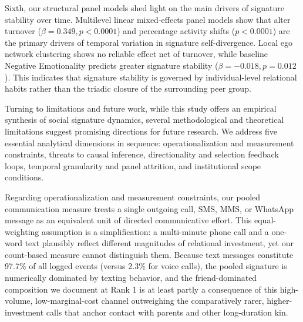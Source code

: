 \documentclass[11pt,letterpaper]{article}
\begin{document}
Sixth, our structural panel models shed light on the main drivers of signature stability over time. Multilevel linear mixed-effects panel models show that alter turnover ($\beta = 0.349, p < 0.0001$) and percentage activity shifts ($p < 0.0001$) are the primary drivers of temporal variation in signature self-divergence. Local ego network clustering shows no reliable effect net of turnover, while baseline Negative Emotionality predicts greater signature stability ($\beta = -0.018, p = 0.012$). This indicates that signature stability is governed by individual-level relational habits rather than the triadic closure of the surrounding peer group.

Turning to limitations and future work, while this study offers an empirical synthesis of social signature dynamics, several methodological and theoretical limitations suggest promising directions for future research. We address five essential analytical dimensions in sequence: operationalization and measurement constraints, threats to causal inference, directionality and selection feedback loops, temporal granularity and panel attrition, and institutional scope conditions.

Regarding operationalization and measurement constraints, our pooled communication measure treats a single outgoing call, SMS, MMS, or WhatsApp message as an equivalent unit of directed communicative effort. This equal-weighting assumption is a simplification: a multi-minute phone call and a one-word text plausibly reflect different magnitudes of relational investment, yet our count-based measure cannot distinguish them. Because text messages constitute 97.7\% of all logged events (versus 2.3\% for voice calls), the pooled signature is numerically dominated by texting behavior, and the friend-dominated composition we document at Rank 1 is at least partly a consequence of this high-volume, low-marginal-cost channel outweighing the comparatively rarer, higher-investment calls that anchor contact with parents and other long-duration kin. 
\end{document}
